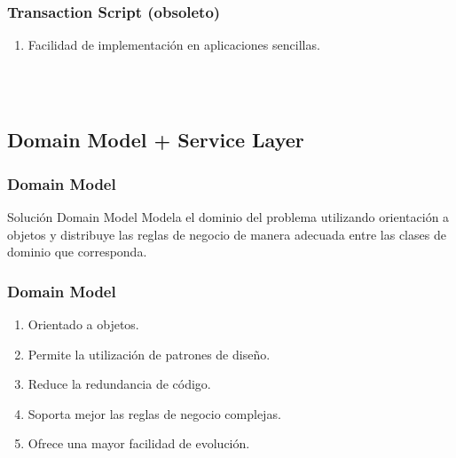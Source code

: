 \documentclass[a4paper,slidestop,xcolor=pst,dvips,blue]{beamer}
\begin{document}
\begin{frame}[c]
    \frametitle{Transaction Script (obsoleto)}
    \begin{enumerate}
        \item<2-> Facilidad de implementación en aplicaciones sencillas.
    \end{enumerate}
    \ \\ \ \\
\end{frame}

\subsection{Domain Model + Service Layer}

\begin{frame}[c]
    \frametitle{Domain Model}
    \begin{block}{Solución Domain Model}
        Modela el dominio del problema utilizando orientación a objetos y distribuye las reglas de negocio de manera adecuada entre las clases de dominio que corresponda.
    \end{block}
\end{frame}

\begin{frame}[c]
    \frametitle{Domain Model}
    \begin{enumerate}
        \item<2-> Orientado a objetos.
        \item<3-> Permite la utilización de patrones de diseño.
        \item<4-> Reduce la redundancia de código.
        \item<5-> Soporta mejor las reglas de negocio complejas.
        \item<6-> Ofrece una mayor facilidad de evolución.
    \end{enumerate}
    \ \\ \ \\
\end{frame}
\end{document}
